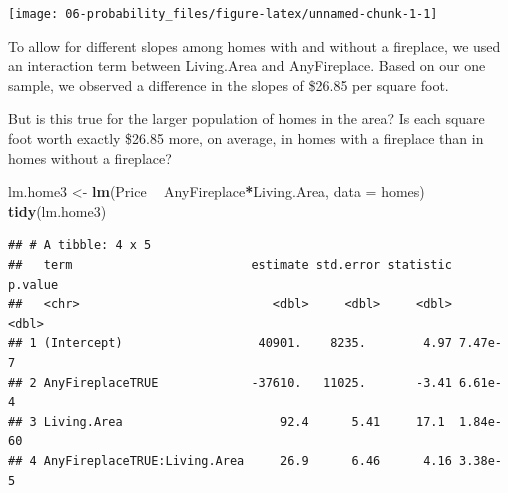 \documentclass[
]{book}
\newenvironment{Shaded}{\begin{snugshade}}{\end{snugshade}}
\newcommand{\DataTypeTok}[1]{\textcolor[rgb]{0.13,0.29,0.53}{#1}}
\newcommand{\DecValTok}[1]{\textcolor[rgb]{0.00,0.00,0.81}{#1}}
\newcommand{\FloatTok}[1]{\textcolor[rgb]{0.00,0.00,0.81}{#1}}
\newcommand{\KeywordTok}[1]{\textcolor[rgb]{0.13,0.29,0.53}{\textbf{#1}}}
\newcommand{\NormalTok}[1]{#1}
\newcommand{\OperatorTok}[1]{\textcolor[rgb]{0.81,0.36,0.00}{\textbf{#1}}}
\newcommand{\StringTok}[1]{\textcolor[rgb]{0.31,0.60,0.02}{#1}}
\begin{document}
\begin{Shaded}
\end{Shaded}

\begin{center}\texttt{[image: 06-probability\_files/figure-latex/unnamed-chunk-1-1]} \end{center}

To allow for different slopes among homes with and without a fireplace, we used an interaction term between Living.Area and AnyFireplace. Based on our one sample, we observed a difference in the slopes of \$26.85 per square foot.

But is this true for the larger population of homes in the area? Is each square foot worth exactly \$26.85 more, on average, in homes with a fireplace than in homes without a fireplace?

\begin{Shaded}
\begin{Highlighting}[]
\NormalTok{lm.home3 <-}\StringTok{ }\KeywordTok{lm}\NormalTok{(Price }\OperatorTok{~}\StringTok{ }\NormalTok{AnyFireplace}\OperatorTok{*}\NormalTok{Living.Area, }\DataTypeTok{data =}\NormalTok{ homes)}
\KeywordTok{tidy}\NormalTok{(lm.home3)}
\end{Highlighting}
\end{Shaded}

\begin{verbatim}
## # A tibble: 4 x 5
##   term                         estimate std.error statistic  p.value
##   <chr>                           <dbl>     <dbl>     <dbl>    <dbl>
## 1 (Intercept)                   40901.    8235.        4.97 7.47e- 7
## 2 AnyFireplaceTRUE             -37610.   11025.       -3.41 6.61e- 4
## 3 Living.Area                      92.4      5.41     17.1  1.84e-60
## 4 AnyFireplaceTRUE:Living.Area     26.9      6.46      4.16 3.38e- 5
\end{verbatim}
\end{document}
